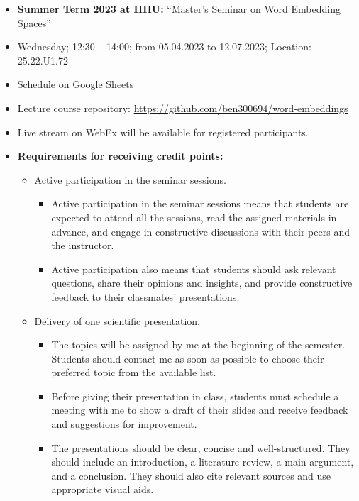 \documentclass[11pt, a4paper]{amsart}
\begin{document}
\begin{itemize}
    \item \textbf{Summer Term 2023 at HHU:} 
     ``Master's Seminar on Word Embedding Spaces''
    \item Wednesday; 12:30 -- 14:00; from 05.04.2023 to 12.07.2023; Location: 25.22.U1.72
    \item \href{https://docs.google.com/spreadsheets/d/1V-d-QuJIUniPq9q-Xviu_TdLZHlW_xzBTqhDX_lIG9w/edit?usp=sharing}{Schedule on Google Sheets}
    \item Lecture course repository: \url{https://github.com/ben300694/word-embeddings}
    \item Live stream on WebEx will be available for registered participants.
    \item \textbf{Requirements for receiving credit points:}
    \begin{itemize}
        \item Active participation in the seminar sessions. 
        \begin{itemize}
        	\item Active participation in the seminar sessions means that students are expected to attend all the sessions, read the assigned materials in advance, and engage in constructive discussions with their peers and the instructor.
        	\item Active participation also means that students should ask relevant questions, share their opinions and insights, and provide constructive feedback to their classmates’ presentations.
        \end{itemize}
        \item Delivery of one scientific presentation.
        \begin{itemize}
        	\item The topics will be assigned by me at the beginning of the semester.
        	Students should contact me as soon as possible to choose their preferred topic from the available list.
        	\item Before giving their presentation in class, students must schedule a meeting with me to show a draft of their slides and receive feedback and suggestions for improvement.
        	\item The presentations should be clear, concise and well-structured.
        	They should include an introduction, a literature review, a main argument, and a conclusion.
        	They should also cite relevant sources and use appropriate visual aids.
        \end{itemize}

\end{itemize}
\end{itemize}
\end{document}
